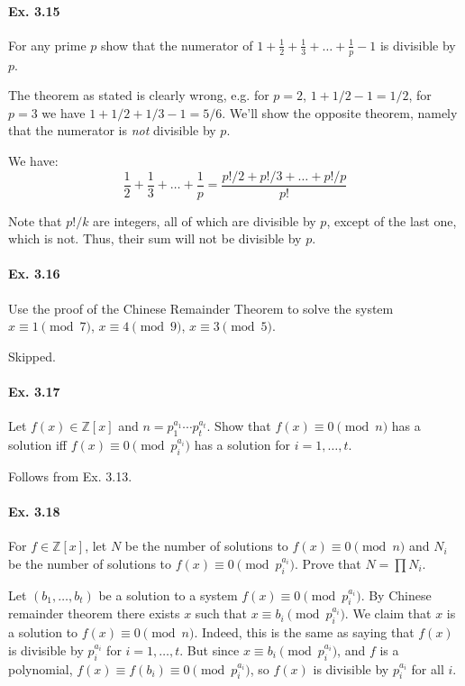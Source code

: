 \documentclass[notitlepage]{article}
\theoremstyle{definition}
\newcommand\Z{\mathbb{Z}}
\begin{document}
\paragraph{Ex. 3.15}
For any prime $p$ show that the numerator of $1+ \frac{1}{2} +
\frac{1}{3} + \ldots + \frac{1}{p}-1$ is divisible by $p$.

The theorem as stated is clearly wrong, e.g. for $p = 2$, $1 + 1/2 - 1
= 1/2$, for $p = 3$ we have $1 + 1/2 + 1/3 -1 = 5/6$. We'll show the
opposite theorem, namely that the numerator is \emph{not} divisible by
$p$.

We have:
\begin{equation}
  \frac{1}{2} + \frac{1}{3} + \ldots + \frac{1}{p} = \frac{p!/2 + p!/3
    + \ldots + p!/p}{p!}
\end{equation}

Note that $p!/k$ are integers, all of which are divisible by $p$,
except of the last one, which is not. Thus, their sum will not be
divisible by $p$.

\paragraph{Ex. 3.16}
Use the proof of the Chinese Remainder Theorem to solve the system $x \equiv 1 \pmod 7$,
$x \equiv 4 \pmod 9$, $x \equiv 3 \pmod 5$.

Skipped.

\paragraph{Ex. 3.17}
Let $f(x) \in \Z[x]$ and $n = p_1^{a_1} \cdots p_t^{a_t}$. Show that
$f(x) \equiv 0 \pmod n$ has a solution iff $f(x) \equiv 0 \pmod
{p_i^{a_i}}$ has a solution for $i = 1, \ldots, t$.

Follows from Ex. 3.13.

\paragraph{Ex. 3.18}
For $f \in \Z[x]$, let $N$ be the number of solutions to $f(x) \equiv
0 \pmod n$ and $N_i$ be the number of solutions to $f(x) \equiv 0
\pmod {p_i^{a_i}}$. Prove that $N = \prod N_i$.

Let $(b_1, \ldots, b_t)$ be a solution to a system $f(x) \equiv 0
\pmod {p_i^{a_i}}$. By Chinese remainder theorem there exists $x$ such
that $x \equiv b_i \pmod {p_i^{a_i}}$. We claim that $x$ is a solution
to $f(x) \equiv 0 \pmod n$. Indeed, this is the same as saying that
$f(x)$ is divisible by $p_i^{a_i}$ for $i = 1, \ldots, t$. But since
$x \equiv b_i \pmod {p_i^{a_i}}$, and $f$ is a polynomial, $f(x)
\equiv f(b_i) \equiv 0 \pmod {p_i^{a_i}}$, so $f(x)$ is divisible by
${p_i^{a_i}}$ for all $i$.
\end{document}
